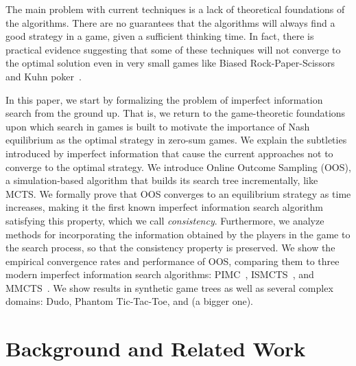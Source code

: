 \documentclass[letterpaper]{article}
\newcounter{vlNoteCounter}
\newcommand{\vlnote}[1]{{\scriptsize \color{blue} $\blacksquare$ \refstepcounter{vlNoteCounter}\textsf{[VL]$_{\arabic{vlNoteCounter}}$:{#1}}}}
\begin{document}

The main problem with current techniques is a lack of theoretical foundations of the algorithms. There are no guarantees that the algorithms will always find a good strategy in a game, given a sufficient thinking time. In fact, there is practical evidence suggesting that some of these techniques will not converge to the optimal solution even in very small games like Biased Rock-Paper-Scissors and Kuhn poker~\cite{Shafiei09,Ponsen11Computing}.

In this paper, we start by formalizing the problem of imperfect information search from the ground up. That is, we return to the game-theoretic 
foundations upon which search in games is built to motivate the importance of Nash equilibrium as the optimal strategy in zero-sum games. We explain the subtleties introduced by imperfect information that cause the current approaches not to converge to the optimal strategy. We introduce Online Outcome Sampling (OOS), a simulation-based algorithm that builds its search tree incrementally, like MCTS.  
We formally prove that OOS converges to an equilibrium strategy as time increases, making it the first 
known imperfect information search algorithm satisfying this property, which we call {\it consistency}. Furthermore, we analyze methods for incorporating the information obtained by the players in the game to the search process, so that the consistency property is preserved. We show the empirical convergence rates and performance of OOS, comparing them to three modern imperfect information search algorithms: 
PIMC~\cite{Long10Understanding}, ISMCTS~\cite{Cowling12ISMCTS}, and MMCTS~\cite{Auger11Multiple}.
We show results in synthetic game trees as well as several complex domains: Dudo, Phantom Tic-Tac-Toe, 
and (a bigger one).



\section{Background and Related Work}
\end{document}
